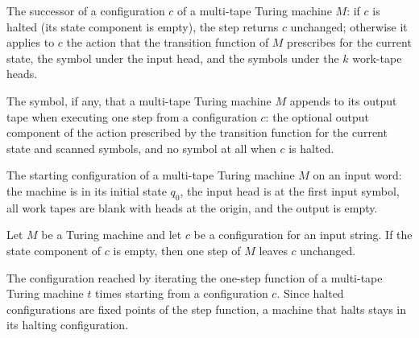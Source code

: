 \begin{definition}
\label{Turing.MultiTapeTM.step}
\leanok
{}
The successor of a configuration $c$ of a multi-tape Turing machine $M$: if
$c$ is halted (its state component is empty), the step returns $c$ unchanged;
otherwise it applies to $c$ the action that the transition function of $M$
prescribes for the current state, the symbol under the input head, and the
symbols under the $k$ work-tape heads.
\end{definition}

\begin{definition}
\label{Turing.MultiTapeTM.outputSymbol}
\leanok
{}
The symbol, if any, that a multi-tape Turing machine $M$ appends to its output
tape when executing one step from a configuration $c$: the optional output
component of the action prescribed by the transition function for the current
state and scanned symbols, and no symbol at all when $c$ is halted.
\end{definition}

\begin{definition}
\label{Turing.MultiTapeTM.initCfg}
\leanok
{}
The starting configuration of a multi-tape Turing machine $M$ on an input
word: the machine is in its initial state $q_0$, the input head is at the
first input symbol, all work tapes are blank with heads at the origin, and the
output is empty.
\end{definition}

\begin{lemma}
\label{Turing.MultiTapeTM.step_of_halt}
\leanok
{}
Let $M$ be a Turing machine and let $c$ be a configuration for an input string. If the
state component of $c$ is empty, then one step of $M$ leaves $c$ unchanged.
\end{lemma}

\begin{definition}
\label{Turing.MultiTapeTM.runFrom}
\leanok
{}
The configuration reached by iterating the one-step function of a multi-tape
Turing machine $t$ times starting from a configuration $c$.  Since halted
configurations are fixed points of the step function, a machine that halts
stays in its halting configuration.
\end{definition}

